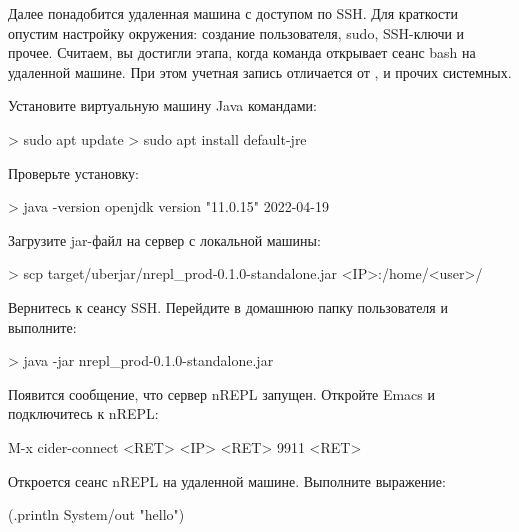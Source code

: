 Далее понадобится удаленная машина с доступом по SSH. Для краткости опустим настройку окружения: создание пользователя, sudo, SSH-ключи и прочее. Считаем, вы достигли этапа, когда команда  открывает сеанс bash на удаленной машине. При этом учетная запись отличается от ,  и прочих системных.

Установите виртуальную машину Java командами:

\begin{english}
  \begin{bash}
> sudo apt update
> sudo apt install default-jre
  \end{bash}
\end{english}

Проверьте установку:

\begin{english}
  \begin{bash}
> java -version
openjdk version "11.0.15" 2022-04-19
  \end{bash}
\end{english}

Загрузите jar-файл на сервер с локальной машины:

\begin{english}
  \begin{bash}
> scp target/uberjar/nrepl_prod-0.1.0-standalone.jar <IP>:/home/<user>/
  \end{bash}
\end{english}

Вернитесь к сеансу SSH. Перейдите в домашнюю папку пользователя и выполните:

\begin{english}
  \begin{bash}
> java -jar nrepl_prod-0.1.0-standalone.jar
  \end{bash}
\end{english}

Появится сообщение, что сервер nREPL запущен. Откройте Emacs и подключитесь к nREPL:

\begin{english}
  \begin{text}
M-x cider-connect <RET> <IP> <RET> 9911 <RET>
  \end{text}
\end{english}

Откроется сеанс nREPL на удаленной машине. Выполните выражение:

\begin{english}
  \begin{clojure}
(.println System/out "hello")
  \end{clojure}
\end{english}

